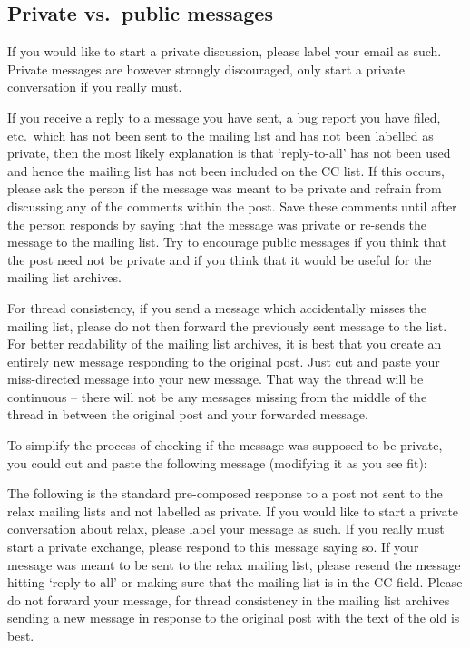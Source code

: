 \subsection{Private vs.\ public messages}

If you would like to start a private discussion, please label your email as such.  Private messages are however strongly discouraged, only start a private conversation if you really must.

If you receive a reply to a message you have sent, a bug report you have filed, etc.\ which has not been sent to the mailing list and has not been labelled as private, then the most likely explanation is that `reply-to-all' has not been used and hence the mailing list has not been included on the CC list.  If this occurs, please ask the person if the message was meant to be private and refrain from discussing any of the comments within the post.  Save these comments until after the person responds by saying that the message was private or re-sends the message to the mailing list.  Try to encourage public messages if you think that the post need not be private and if you think that it would be useful for the mailing list archives.

For thread consistency, if you send a message which accidentally misses the mailing list, please do not then forward the previously sent message to the list.  For better readability of the mailing list archives, it is best that you create an entirely new message responding to the original post.  Just cut and paste your miss-directed message into your new message.  That way the thread will be continuous -- there will not be any messages missing from the middle of the thread in between the original post and your forwarded message.

To simplify the process of checking if the message was supposed to be private, you could cut and paste the following message (modifying it as you see fit):

\begin{exampleenv}
The following is the standard pre-composed response to a post not sent to the relax mailing lists and not labelled as private.  If you would like to start a private conversation about relax, please label your message as such.  If you really must start a private exchange, please respond to this message saying so.  If your message was meant to be sent to the relax mailing list, please resend the message hitting `reply-to-all' or making sure that the mailing list is in the CC field.  Please do not forward your message, for thread consistency in the mailing list archives sending a new message in response to the original post with the text of the old is best.
\end{exampleenv}




